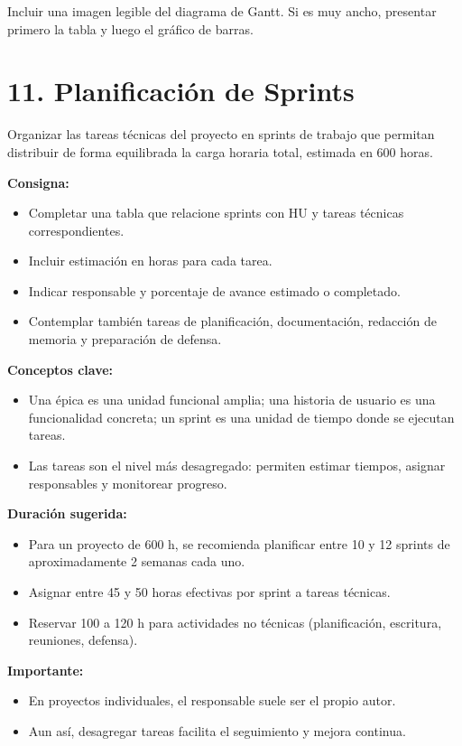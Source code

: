 \documentclass[
11pt, %
]{ProyectoVpC}
\begin{document}
Incluir una imagen legible del diagrama de Gantt. Si es muy ancho, presentar primero la tabla y luego el gráfico de barras.

\section{11. Planificación de Sprints}

Organizar las tareas técnicas del proyecto en sprints de trabajo que permitan distribuir de forma equilibrada la carga horaria total, estimada en 600 horas.

\textbf{Consigna:}
\begin{itemize}
  \item Completar una tabla que relacione sprints con HU y tareas técnicas correspondientes.
  \item Incluir estimación en horas para cada tarea.
  \item Indicar responsable y porcentaje de avance estimado o completado.
  \item Contemplar también tareas de planificación, documentación, redacción de memoria y preparación de defensa.
\end{itemize}

\textbf{Conceptos clave:}
\begin{itemize}
  \item Una \'{e}pica es una unidad funcional amplia; una historia de usuario es una funcionalidad concreta; un sprint es una unidad de tiempo donde se ejecutan tareas.
  \item Las tareas son el nivel más desagregado: permiten estimar tiempos, asignar responsables y monitorear progreso.
\end{itemize}

\textbf{Duración sugerida:}
\begin{itemize}
  \item Para un proyecto de 600 h, se recomienda planificar entre 10 y 12 sprints de aproximadamente 2 semanas cada uno.
  \item Asignar entre 45 y 50 horas efectivas por sprint a tareas técnicas.
  \item Reservar 100 a 120 h para actividades no técnicas (planificación, escritura, reuniones, defensa).
\end{itemize}

\textbf{Importante:}
\begin{itemize}
  \item En proyectos individuales, el responsable suele ser el propio autor.
  \item Aun así, desagregar tareas facilita el seguimiento y mejora continua.
\end{itemize}
\end{document}
